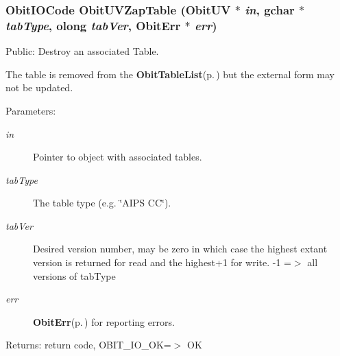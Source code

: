 \subsubsection{\setlength{\rightskip}{0pt plus 5cm}Obit\-IOCode Obit\-UVZap\-Table ({\bf Obit\-UV} $\ast$ {\em in}, gchar $\ast$ {\em tab\-Type}, {\bf olong} {\em tab\-Ver}, {\bf Obit\-Err} $\ast$ {\em err})}\label{ObitUV_8h_a46}


Public: Destroy an associated Table. 

The table is removed from the {\bf Obit\-Table\-List}{\rm (p.\,\pageref{structObitTableList})} but the external form may not be updated. \begin{Desc}
\item[Parameters:]
\begin{description}
\item[{\em in}]Pointer to object with associated tables. \item[{\em tab\-Type}]The table type (e.g. \char`\"{}AIPS CC\char`\"{}). \item[{\em tab\-Ver}]Desired version number, may be zero in which case the highest extant version is returned for read and the highest+1 for write. -1 =$>$ all versions of tab\-Type \item[{\em err}]{\bf Obit\-Err}{\rm (p.\,\pageref{structObitErr})} for reporting errors. \end{description}
\end{Desc}
\begin{Desc}
\item[Returns:]return code, OBIT\_\-IO\_\-OK=$>$ OK \end{Desc}
